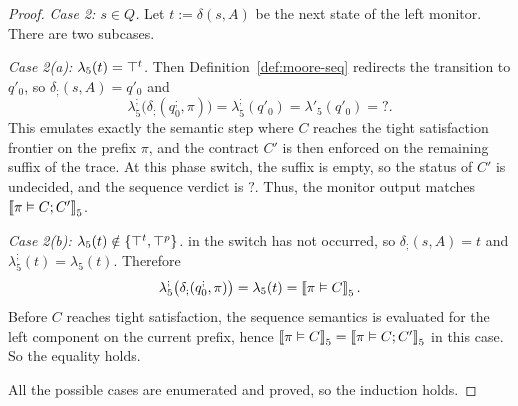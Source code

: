 \begin{proof}
    \smallskip
    \noindent\emph{Case 2: $s\in Q$.}
    Let $t:=\delta(s,A)$ be the next state of the left monitor.
    There are two subcases.
    
    \smallskip
    \noindent\emph{Case 2(a): $\lambda_5(t)=\top^t$.}
    Then Definition~\ref{def:moore-seq} redirects the transition to $q'_0$, so $\delta_{;}(s,A)=q'_0$ and
    \[
    \lambda_5^{;}\big(\delta_{;}(q_0^{;},\pi)\big)
    =
    \lambda_5^{;}(q'_0)
    =
    \lambda'_5(q'_0)
    =
    \mathsf{?}.
    \]
    This emulates exactly the semantic step where $C$ reaches the tight satisfaction frontier on the prefix $\pi$, and the contract $C'$ is then enforced on the remaining suffix of the trace.
    At this phase switch, the suffix is empty, so the status of $C'$ is undecided, and the sequence verdict is $\mathsf{?}$.
    Thus, the monitor output matches $\left\llbracket \pi \vDash C;C' \right\rrbracket_{5}$.
    
    \smallskip
    \noindent\emph{Case 2(b): $\lambda_5(t)\notin\{\top^t,\top^p\}$.}
    in the switch has not occurred, so $\delta_{;}(s,A)=t$ and $\lambda_5^{;}(t)=\lambda_5(t)$.
    Therefore
    \[
    \lambda_5^{;}\big(\delta_{;}(q_0^{;},\pi)\big)
    =
    \lambda_5(t)
    =
    \left\llbracket \pi \vDash C \right\rrbracket_{5}.
    \]
    Before $C$ reaches tight satisfaction, the sequence semantics is evaluated for the left component on the current prefix, hence $\left\llbracket \pi \vDash C \right\rrbracket_{5}=\left\llbracket \pi \vDash C;C' \right\rrbracket_{5}$ in this case. So the equality holds.
    
    All the possible cases are enumerated and proved, so the induction holds.
    \end{proof}





